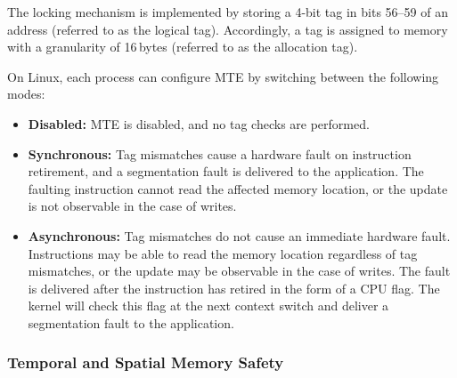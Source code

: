 The locking mechanism is implemented by storing a 4-bit tag in bits 56--59 of an address (referred to as the logical tag).
Accordingly, a tag is assigned to memory with a granularity of 16\,bytes (referred to as the allocation tag).

On Linux, each process can configure \ac{MTE} by switching between the following modes:
\begin{itemize}
    \item \textbf{Disabled:} \ac{MTE} is disabled, and no tag checks are performed.
    \item \textbf{Synchronous:}
    Tag mismatches cause a hardware fault on instruction retirement, and a segmentation fault is delivered to the application.
    The faulting instruction cannot read the affected memory location, or the update is not observable in the case of writes.
    \item \textbf{Asynchronous:}
    Tag mismatches do not cause an immediate hardware fault.
    Instructions may be able to read the memory location regardless of tag mismatches, or the update may be observable in the case of writes.
    The fault is delivered after the instruction has retired in the form of a CPU flag.
    The kernel will check this flag at the next context switch and deliver a segmentation fault to the application.
\end{itemize}

\subsubsection{Temporal and Spatial Memory Safety}

